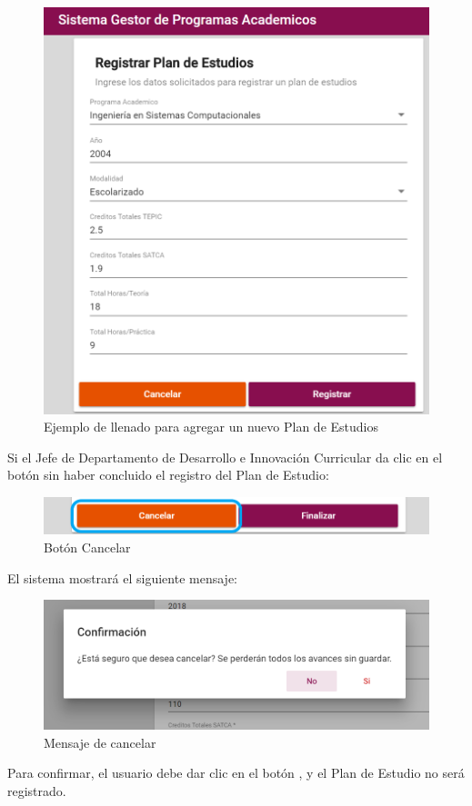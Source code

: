 \begin{figure}[!hbtp]
	\centering
	\hypertarget{ejreg}{\includegraphics[width=0.7\linewidth]{images/SP4-GPE/registrarEjem}}
	\caption{Ejemplo de llenado para agregar un nuevo Plan de Estudios}
	\label{ejreg}
\end{figure}
Si el Jefe de Departamento de Desarrollo e Innovación Curricular da clic en el botón  sin haber concluido el registro del Plan de Estudio:

\begin{figure}[!hbtp]
	\centering
	\hypertarget{cancel2}{\includegraphics[width=0.7\linewidth]{images/SP4-GPE/cancelarPE}}
	\caption{Botón Cancelar}
	\label{cancel2}
\end{figure}
\newpage

El sistema mostrará el siguiente mensaje:
\begin{figure}[!hbtp]
	\centering
	\hypertarget{ms1}{\includegraphics[width=0.7\linewidth]{images/SP4-GPE/m1}}
	\caption{Mensaje de cancelar}
	\label{ms1}
\end{figure}

Para confirmar, el usuario debe dar clic en el botón  , y el Plan de Estudio no será registrado.\\

